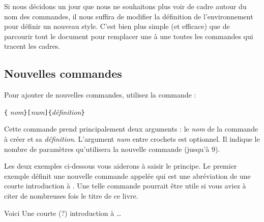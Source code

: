 Si nous décidons un jour que nous ne souhaitons plus voir de cadre
autour du nom des commandes, il nous suffira de modifier la définition
de l'environnement  pour définir un nouveau style.  C'est
bien plus simple (et efficace) que de parcourir tout le document pour
remplacer une à une toutes les commandes qui tracent les cadres.

% 
% 

\subsection{Nouvelles commandes}

Pour ajouter de nouvelles commandes, utilisez la commande :
\begin{lscommand}
\verb|{|%
       \emph{nom}\verb|}[|\emph{num}\verb|]{|\emph{définition}\verb|}|
\end{lscommand}
\noindent Cette commande prend principalement deux
arguments : le \emph{nom} de la commande à créer et sa
\emph{définition}. L'argument \emph{num} entre crochets est
optionnel. Il indique le nombre de paramètres  qu'utilisera la
nouvelle commande (jusqu'à 9).

Les deux exemples ci-dessous vous aiderons à saisir le principe.
Le premier exemple définit une nouvelle commande appelée 
qui est une abréviation de \og une courte introduction à
\LaTeXe \fg{}. Une telle commande pourrait être utile si vous aviez à
citer de nombreuses fois le titre de ce livre.

\begin{example}
\newcommand{\ucil}
    {Une courte (?) 
     introduction à \LaTeXe}
Voici \og \ucil \fg\dots
\end{example}

